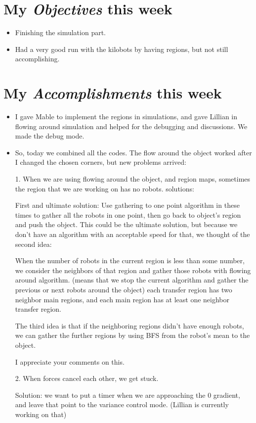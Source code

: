 \newcommand{\handoutName}{Weekly report}
\newcommand{\handoutdate}{\today}


\section{My \emph{Objectives} this week}
\begin{itemize}
\item Finishing the simulation part.
\item Had a very good run with the kilobots by having regions, but not still accomplishing.

\end{itemize}
\section{My \emph{Accomplishments} this week}


\begin{itemize}
\item I gave Mable to implement the regions in simulations, and gave Lillian in flowing around simulation and helped for the debugging and discussions. We made the debug mode.
\item So, today we combined all the codes. The flow around the object worked after I changed the chosen corners, but new problems arrived:

1. When we are using flowing around the object, and region maps, sometimes the region that we are working on has no robots.
solutions:

First and ultimate solution: Use gathering to one point algorithm in these times to gather all the robots in one point, then go back to object's region and push the object. This could be the ultimate solution, but because we don't have an algorithm with an acceptable speed for that, we thought of the second idea:

When the number of robots in the current region is less than some number, we consider the neighbors of that region and gather those robots with flowing around algorithm. (means that we stop the current algorithm and gather the previous or next robots around the object) each transfer region has two neighbor main regions, and each main region has at least one neighbor transfer region. 

The third idea is that if the neighboring regions didn't have enough robots, we can gather the further regions by using BFS from the robot's mean to the object.

I appreciate your comments on this.


2. When forces cancel each other, we get stuck. 

Solution: we want to put a timer when we are approaching the 0 gradient, and leave that point to the variance control mode. (Lillian is currently working on that)

\end{itemize}


